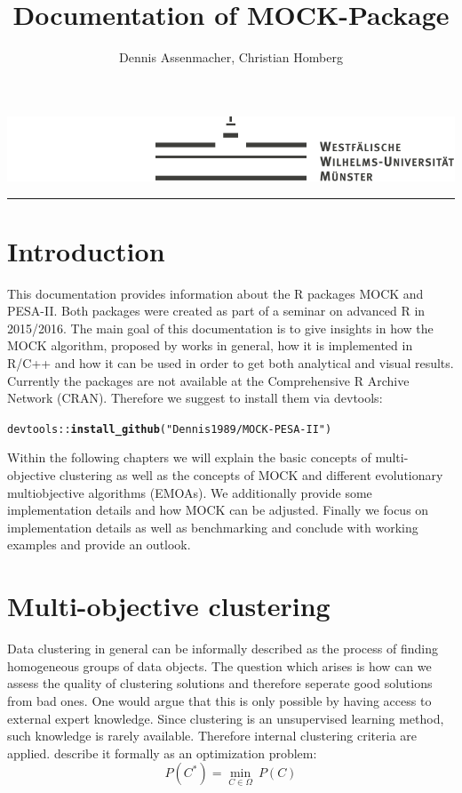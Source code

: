 \documentclass[parskip=half,DIV=14]{scrartcl}\usepackage[]{graphicx}\usepackage[]{color}
\title{Documentation of MOCK-Package}
\author{Dennis Assenmacher, Christian Homberg}
\makeatletter
\newcommand{\hlstr}[1]{\textcolor[rgb]{0.192,0.494,0.8}{#1}}%
\newcommand{\hlopt}[1]{\textcolor[rgb]{0,0,0}{#1}}%
\newcommand{\hlstd}[1]{\textcolor[rgb]{0.345,0.345,0.345}{#1}}%
\newcommand{\hlkwd}[1]{\textcolor[rgb]{0.737,0.353,0.396}{\textbf{#1}}}%
\newenvironment{kframe}{%
 \def\at@end@of@kframe{}%
 \ifinner\ifhmode%
  \def\at@end@of@kframe{\end{minipage}}%
  \begin{minipage}{\columnwidth}%
 \fi\fi%
 \def\FrameCommand##1{\hskip\@totalleftmargin \hskip-\fboxsep
 \colorbox{shadecolor}{##1}\hskip-\fboxsep
     \hskip-\linewidth \hskip-\@totalleftmargin \hskip\columnwidth}%
 \MakeFramed {\advance\hsize-\width
   \@totalleftmargin\z@ \linewidth\hsize
   \@setminipage}}%
 {\par\unskip\endMakeFramed%
 \at@end@of@kframe}
\newenvironment{knitrout}{}{} %
\renewcommand{\maketitle}{
   \clearscrheadfoot
   \cfoot{\pagemark}
   \begin{titlepage}
   
   \thispagestyle{scrheadings}
   \begin{center}
   \vspace*{-2cm}
   \includegraphics{wwu}
   \vspace{8pt}
   \hrule
   \vspace{15pt}
       {\Huge \@title}
 
   \vspace{\parskip}
 
   {\Large \@author}
 
   \@date
   \end{center}
   \end{titlepage}
}
\makeatother
\begin{document}
\maketitle

\section{Introduction}
This documentation provides information about the R packages MOCK and PESA-II. Both packages were created as part of a seminar on advanced R in 2015/2016. The main goal of this documentation is to give insights in how the MOCK algorithm, proposed by \textcite{handl} works in general, how it is implemented in R/C++ and how it can be used in order to get both analytical and visual results. Currently the packages are not available at the Comprehensive R Archive Network (CRAN). Therefore we suggest to install them via devtools:
\begin{knitrout}
\color{fgcolor}\begin{kframe}
\begin{alltt}
\hlstd{devtools}\hlopt{::}\hlkwd{install_github}\hlstd{(}\hlstr{"Dennis1989/MOCK-PESA-II"}\hlstd{)}
\end{alltt}
\end{kframe}
\end{knitrout}

Within the following chapters we will explain the basic concepts of multi-objective clustering as well as the concepts of MOCK and different evolutionary multiobjective algorithms (EMOAs). We additionally provide some implementation details and how MOCK can be adjusted. Finally we focus on implementation details as well as benchmarking and conclude with working examples and provide an outlook.
\section{Multi-objective clustering}
Data clustering in general can be informally described as the process of finding homogeneous groups of data objects. The question which arises is how can we assess the quality of clustering solutions and therefore seperate good solutions from bad ones. One would argue that this is only possible by having access to external expert knowledge. Since clustering is an unsupervised learning method, such knowledge is rarely available. Therefore internal clustering criteria are applied. \textcite{handl2007} describe it formally as an optimization problem: 
\begin{displaymath}
P(C^*) = \underset{C\in\Omega}{\min}\ P(C)
\end{displaymath}
\end{document}
